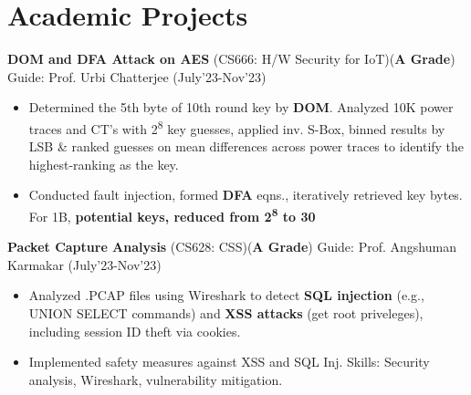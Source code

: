 \documentclass[10.8pt, a4paper]{extarticle}
\newcommand{\shorterSection}[1]{\vspace{-10pt}\section{#1}}
\begin{document}
\vspace{4pt}
\shorterSection{Academic Projects}
\vspace{2pt}

\textbf{DOM and DFA Attack on AES} (CS666: H/W Security for IoT)(\textbf{A Grade}) Guide: Prof. Urbi Chatterjee \href{https://github.com/souvikcseiitk/CS666-Hardware-Security-for-Internet-of-Things/tree/main/Assignment%203}{\faGithub{}}  \hfill(July'23-Nov'23)
	\\[-0.6cm]

 \begin{itemize}
\item  Determined the 5th byte of 10th round key by \textbf{DOM}. Analyzed 10K power traces and CT's with 2\textsuperscript{8} key guesses, applied inv. S-Box, binned results by LSB \& ranked guesses on mean differences across power traces to identify the highest-ranking as the key. \\[-0.6cm]
\item Conducted fault injection, formed \textbf{DFA} eqns., iteratively retrieved key bytes. For 1B, \textbf{potential keys, reduced from 2\textsuperscript{8} to 30} \\[-0.6cm]
\end{itemize}

\vspace{2pt}

 \textbf{Packet Capture Analysis} (CS628: CSS)(\textbf{A Grade}) Guide: Prof. Angshuman Karmakar \href{https://github.com/souvikcseiitk/CS628-Computer-Systems-Security/tree/main/Assignment%204}{\faGithub{}}  \hfill(July'23-Nov'23)
	\\[-0.6cm]
	\begin{itemize}
 
          \item Analyzed .PCAP files using Wireshark to detect \textbf{SQL injection} (e.g., UNION SELECT commands) and \textbf{XSS attacks} (get root priveleges), including session ID theft via cookies.
          \item Implemented safety measures against XSS and SQL Inj. Skills: Security analysis, Wireshark, vulnerability mitigation.
           
\end{itemize}

\vspace{2pt}
\end{document}
